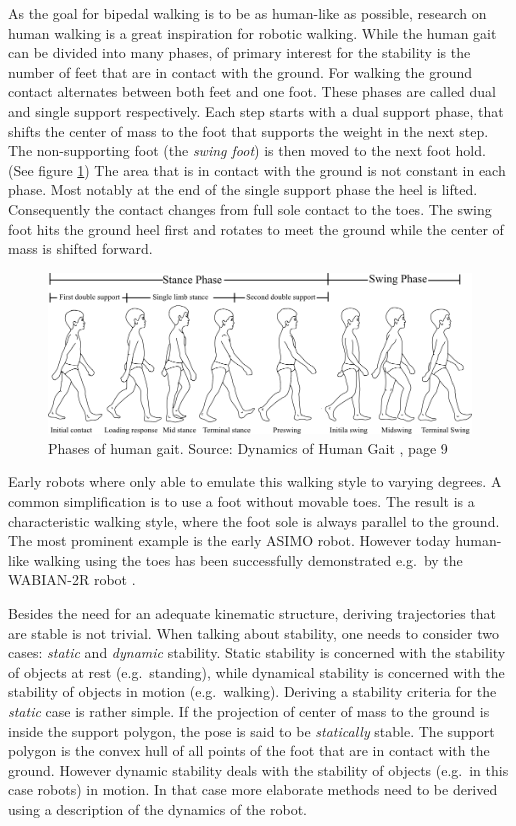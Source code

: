 \documentclass[english,ngerman]{KITreprt}
\newcommand{\name}[1]{\textsc{#1}}
\begin{document}
As the goal for bipedal walking is to be as human-like as possible,
research on human walking is a great inspiration for robotic walking.
While the human gait can be divided into many phases, of primary
interest for the stability is the number of feet that are in contact
with the ground. For walking the ground contact alternates between both
feet and one foot. These phases are called dual and single support
respectively. Each step starts with a dual support phase, that shifts
the center of mass to the foot that supports the weight in the next
step. The non-supporting foot (the \emph{swing foot}) is then moved to
the next foot hold. (See figure \ref{img:human-gait}) The area that is
in contact with the ground is not constant in each phase. Most notably
at the end of the single support phase the heel is lifted. Consequently
the contact changes from full sole contact to the toes. The swing foot
hits the ground heel first and rotates to meet the ground while the
center of mass is shifted forward.

\begin{figure}[tb]
\vspace*{-1em}
\includegraphics[width=\textwidth]{images/human_gait.png}
\caption{Phases of human gait. Source: Dynamics of Human Gait \cite{vaughan1992dynamics}, page 9}
\label{img:human-gait}
\end{figure}

Early robots where only able to emulate this walking style to varying
degrees. A common simplification is to use a foot without movable toes.
The result is a characteristic walking style, where the foot sole is
always parallel to the ground. The most prominent example is the early
\name{ASIMO} robot. However today human-like walking using the toes has
been successfully demonstrated e.g.~by the \name{WABIAN-2R} robot
\cite{ogura2006human}.

Besides the need for an adequate kinematic structure, deriving
trajectories that are stable is not trivial. When talking about
stability, one needs to consider two cases: \emph{static} and
\emph{dynamic} stability. Static stability is concerned with the
stability of objects at rest (e.g.~standing), while dynamical stability
is concerned with the stability of objects in motion (e.g.~walking).
Deriving a stability criteria for the \emph{static} case is rather
simple. If the projection of center of mass to the ground is inside the
support polygon, the pose is said to be \emph{statically} stable. The
support polygon is the convex hull of all points of the foot that are in
contact with the ground. However dynamic stability deals with the
stability of objects (e.g.~in this case robots) in motion. In that case
more elaborate methods need to be derived using a description of the
dynamics of the robot.
\end{document}
